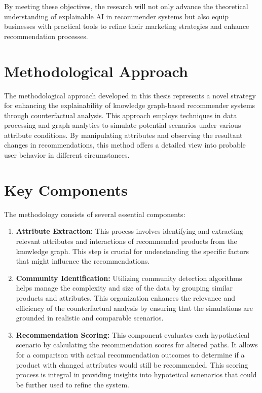 By meeting these objectives, the research will not only advance the theoretical understanding
of explainable AI in recommender systems but also equip businesses with practical
tools to refine their marketing strategies and enhance recommendation processes.

\section{Methodological Approach}

The methodological approach developed in this thesis represents a novel strategy
for enhancing the explainability of knowledge graph-based recommender systems
through counterfactual analysis. This approach employs techniques in data processing
and graph analytics to simulate potential scenarios under various attribute conditions.
By manipulating attributes and observing the resultant changes in
recommendations, this method offers a detailed view into probable user behavior in different
circumstances.

\section*{Key Components}

The methodology consists of several essential components:

\begin{enumerate}
	\item \textbf{Attribute Extraction:} This process involves identifying and
		extracting relevant attributes and interactions of recommended products from
		the knowledge graph. This step is crucial for understanding the specific factors
		that might influence the recommendations.

	\item \textbf{Community Identification:} Utilizing community detection
		algorithms helps manage the complexity and size of the data by grouping
		similar products and attributes. This organization enhances the relevance and
		efficiency of the counterfactual analysis by ensuring that the simulations are
		grounded in realistic and comparable scenarios.

	\item \textbf{Recommendation Scoring:} This component evaluates each
		hypothetical scenario by calculating the recommendation scores for altered
		paths. It allows for a comparison with actual recommendation outcomes to determine
		if a product with changed attributes would still be recommended. This
		scoring process is integral in providing insights into hypotetical scnenarios
		that could be further used to refine the system.
\end{enumerate}

